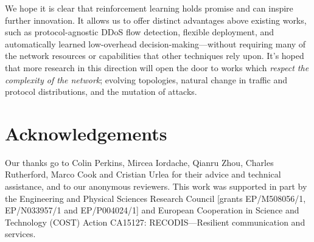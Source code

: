 \documentclass[10pt, times, comsoc]{IEEEtran}
\begin{document}
We hope it is clear that reinforcement learning holds promise and can inspire further innovation.
It allows us to offer distinct advantages above existing works, such as protocol-agnostic DDoS flow detection, flexible deployment, and automatically learned low-overhead decision-making---without requiring many of the 
network resources or capabilities that other techniques rely upon.
It's hoped that more research in this direction will open the door to works which \emph{respect the complexity of the network}; evolving topologies, natural change in traffic and protocol distributions, and the mutation of attacks.

\section*{Acknowledgements}
Our thanks go to Colin Perkins, Mircea Iordache, Qianru Zhou, Charles Rutherford, Marco Cook and Cristian Urlea for their advice and technical assistance, and to our anonymous reviewers.
This work was supported in part by the Engineering and Physical Sciences Research Council [grants EP/M508056/1, EP/N033957/1 and EP/P004024/1] and European Cooperation in Science and Technology (COST) Action CA15127: RECODIS---Resilient communication and services.
\end{document}
